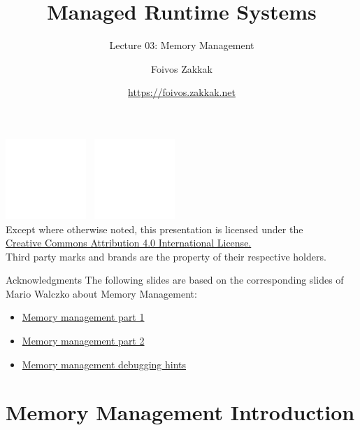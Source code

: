 \documentclass[
14pt,
aspectratio=169,
usenames,
dvipsnames,
x11names]{beamer}
\title{Managed Runtime Systems}
\subtitle{Lecture 03: Memory Management}
\author[\url{https://foivos.zakkak.net}]{Foivos Zakkak}
\date{\url{https://foivos.zakkak.net}}
\begin{document}


\begin{frame}[plain]
  \titlepage
  \centering
  \includegraphics[height=.75cm]{cc}~
  \includegraphics[height=.75cm]{by}\\[1em]
  \scriptsize{Except where otherwise noted, this presentation is licensed under the\\
    \href{http://creativecommons.org/licenses/by/4.0/}%
    {Creative Commons Attribution 4.0 International License.}\\[1ex]
    Third party marks and brands are the property of their respective
    holders.}
\end{frame}


\begin{frame}{Acknowledgments}
  The following slides are based on the corresponding slides of Mario Walczko about Memory Management:

  \begin{itemize}
  \item \href{https://www.dropbox.com/s/bnwq1q677spkglp/7\%20Memory\%20management.pdf}{Memory management part 1}
  \item \href{https://www.dropbox.com/s/gxsuu4uqbgwo88f/7B\%20Memory\%20Management\%2C\%20part\%202.pdf}{Memory management part 2}
  \item \href{https://www.dropbox.com/s/f0lwnc9zjtw8dxy/7C\%20Debugging\%20hints.pdf}{Memory management debugging hints}
\end{itemize}
\end{frame}

\section{Memory Management Introduction}
\end{document}
